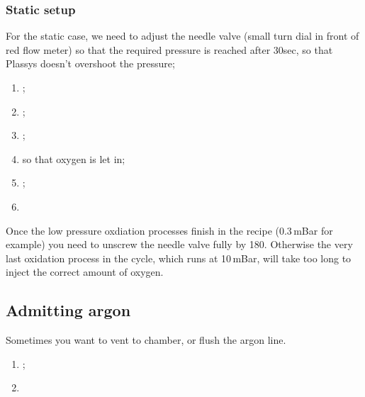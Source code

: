   \subsubsection{Static setup}
  For the static case, we need to adjust the needle valve (small turn
  dial in front  of red flow meter) so that  the required pressure is
  reached  after  30sec,  so   that  Plassys  doesn't  overshoot  the
  pressure;
  \begin{enumerate}
  \item {};
  \item {};
  \item {};
  \item {} so that oxygen is let in;
  \item  {};
  \item  {}
  \end{enumerate}
  {\LARGE Once  the low  pressure oxdiation  processes finish  in the
    recipe (0.3\,mBar  for example)  you need  to unscrew  the needle
    valve  fully  by 180\ideg.   Otherwise  the  very last  oxidation
    process in the cycle, which runs  at 10\,mBar, will take too long
    to inject the correct amount of oxygen.  }

 \subsection{Admitting argon}
 Sometimes you want to vent to chamber, or flush the argon line.
 \begin{enumerate}
 \item {};
 \item {}
 \end{enumerate}
 \newpage
